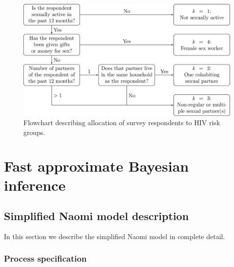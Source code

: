\documentclass[a4paper, nobind]{templates/ociamthesis}
\begin{document}
\begin{figure}

{\centering \includegraphics[width=0.95\linewidth]{resources/multi-agyw/20230627-144735-3da88508/depends/category-flowchart} 

}

\caption{Flowchart describing allocation of survey respondents to HIV risk groups.}\label{fig:category-flowchart}
\end{figure}

\hypertarget{fast-approximate-bayesian-inference}{%
\chapter{Fast approximate Bayesian inference}\label{fast-approximate-bayesian-inference}}

\hypertarget{simplified-naomi-model-description}{%
\section{Simplified Naomi model description}\label{simplified-naomi-model-description}}

In this section we describe the simplified Naomi model \autocite{eaton2021naomi} in complete detail.

\hypertarget{process-specification}{%
\subsection{Process specification}\label{process-specification}}
\end{document}
